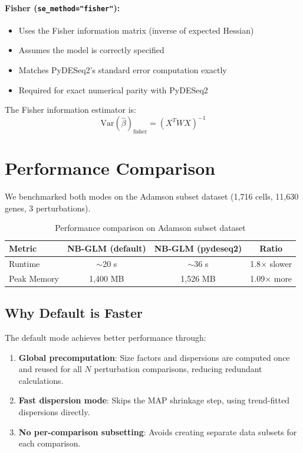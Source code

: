 \documentclass{article}
\begin{document}
\paragraph{Fisher (\texttt{se\_method="fisher"}):}
\begin{itemize}
    \item Uses the Fisher information matrix (inverse of expected Hessian)
    \item Assumes the model is correctly specified
    \item Matches PyDESeq2's standard error computation exactly
    \item Required for exact numerical parity with PyDESeq2
\end{itemize}

The Fisher information estimator is:
\begin{equation}
    \text{Var}(\hat{\beta})_{\text{fisher}} = (X^T W X)^{-1}
\end{equation}

\section{Performance Comparison}

We benchmarked both modes on the Adamson subset dataset (1,716 cells, 11,630 genes, 3 perturbations).

\begin{table}[h]
\centering
\caption{Performance comparison on Adamson subset dataset}
\label{tab:performance}
\begin{tabular}{lccc}
\toprule
\textbf{Metric} & \textbf{NB-GLM (default)} & \textbf{NB-GLM (pydeseq2)} & \textbf{Ratio} \\
\midrule
Runtime & $\sim$20 s & $\sim$36 s & 1.8$\times$ slower \\
Peak Memory & 1,400 MB & 1,526 MB & 1.09$\times$ more \\
\bottomrule
\end{tabular}
\end{table}

\subsection{Why Default is Faster}

The default mode achieves better performance through:

\begin{enumerate}
    \item \textbf{Global precomputation}: Size factors and dispersions are computed once and reused for all $N$ perturbation comparisons, reducing redundant calculations.
    
    \item \textbf{Fast dispersion mode}: Skips the MAP shrinkage step, using trend-fitted dispersions directly.
    
    \item \textbf{No per-comparison subsetting}: Avoids creating separate data subsets for each comparison.
\end{enumerate}
\end{document}
